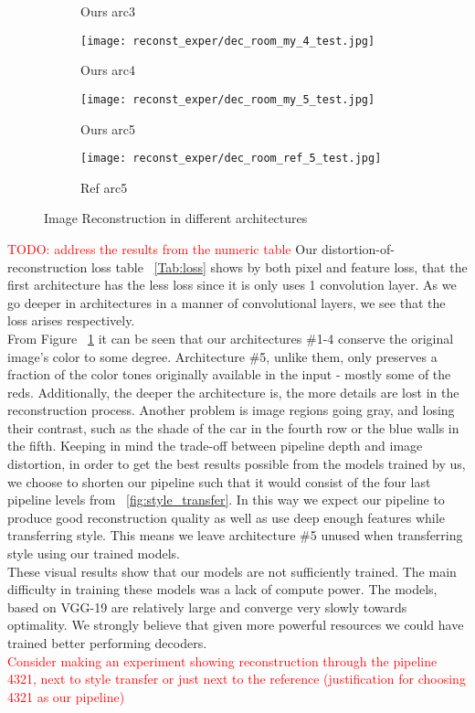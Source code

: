 \begin{figure}[H]
\begin{subfigure}[b]{0.13\linewidth}
		\caption{Ours arc3}
	\end{subfigure}
	\begin{subfigure}[b]{0.13\linewidth}
		\texttt{[image: reconst\_exper/dec\_room\_my\_4\_test.jpg]} %
		\caption{Ours arc4}
	\end{subfigure}
	\begin{subfigure}[b]{0.13\linewidth}
		\texttt{[image: reconst\_exper/dec\_room\_my\_5\_test.jpg]} %
		\caption{Ours arc5}
	\end{subfigure}
	\begin{subfigure}[b]{0.13\linewidth}
		\texttt{[image: reconst\_exper/dec\_room\_ref\_5\_test.jpg]} %
		\caption{Ref arc5}	
	\end{subfigure}
	\caption{Image Reconstruction in different architectures}
	\label{fig:reconstruction}
\end{figure}

\textcolor{red}{TODO: address the results from the numeric table} Our distortion-of-reconstruction loss table ~\ref{Tab:loss} shows by both pixel and feature loss, that the first architecture has the less loss since it is only uses 1 convolution layer. As we go deeper in architectures in a manner of convolutional layers, we see that the loss arises respectively.\\

From Figure ~\ref{fig:reconstruction} it can be seen that our architectures \#1-4 conserve the original image's color to some degree. Architecture \#5, unlike them, only preserves a fraction of the color tones originally available in the input - mostly some of the reds. Additionally, the deeper the architecture is, the more details are lost in the reconstruction process. Another problem is image regions going gray, and losing their contrast, such as the shade of the car in the fourth row or the blue walls in the fifth. Keeping in mind the trade-off between pipeline depth and image distortion, in order to get the best results possible from the models trained by us, we choose to shorten our pipeline such that it would consist of the four last pipeline levels from ~\ref{fig:style_transfer}. In this way we expect our pipeline to produce good reconstruction quality as well as use deep enough features while transferring style. This means we leave architecture \#5 unused when transferring style using our trained models.\\
These visual results show that our models are not sufficiently trained. The main difficulty in training these models was a lack of compute power. The models, based on VGG-19 are relatively large and converge very slowly towards optimality. We strongly believe that given more powerful resources we could have trained better performing decoders.\\
\textcolor{red}{Consider making an experiment showing reconstruction through the pipeline 4321, next to style transfer or just next to the reference (justification for choosing 4321 as our pipeline)}
  
